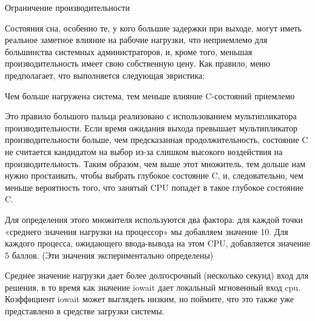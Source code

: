 \documentclass{article}
\begin{document}
Ограничение производительности

Состояния сна, особенно те, у кого большие задержки при выходе, могут иметь реальное заметное влияние на рабочие нагрузки, что неприемлемо для большинства системных администраторов, и, кроме того, меньшая производительность имеет свою собственную цену.
Как правило, меню предполагает, что выполняется следующая эвристика:

Чем больше нагружена система, тем меньше влияние C-состояний приемлемо

Это правило большого пальца реализовано с использованием мультипликатора производительности. Если время ожидания выхода превышает мультипликатор производительности больше, чем предсказанная продолжительность, состояние C не считается кандидатом на выбор из-за слишком высокого воздействия на производительность. Таким образом, чем выше этот множитель, тем дольше нам нужно простаивать, чтобы выбрать глубокое состояние C, и, следовательно, чем меньше вероятность того, что занятый CPU попадет в такое глубокое состояние C.

Для определения этого множителя используются два фактора: для каждой точки «среднего значения нагрузки на процессор» мы добавляем значение 10.
Для каждого процесса, ожидающего ввода-вывода на этом CPU, добавляется значение 5 баллов. (Эти значения экспериментально определены)

Среднее значение нагрузки дает более долгосрочный (несколько секунд) вход для решения, в то время как значение iowait дает локальный мгновенный вход cpu. Коэффициент iowait может выглядеть низким, но поймите, что это также уже представлено в средстве загрузки системы.
\end{document}
